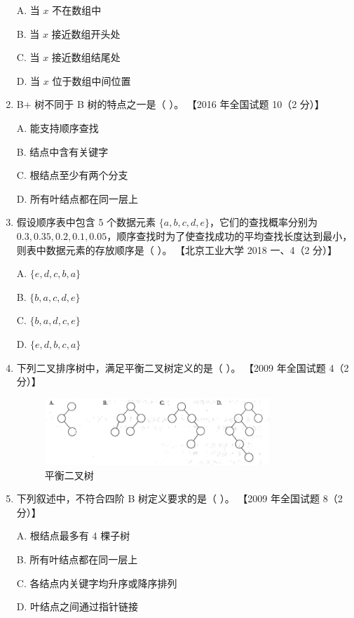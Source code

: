 \documentclass[lang=cn,newtx,10pt,scheme=chinese]{elegantbook}
\begin{document}
\begin{enumerate}
    A. 当 $x$ 不在数组中  

    B. 当 $x$ 接近数组开头处  

    C. 当 $x$ 接近数组结尾处 

    D. 当 $x$ 位于数组中间位置  

    \item B+ 树不同于 B 树的特点之一是（ ）。  
    【2016 年全国试题 10（2 分）】  

    A. 能支持顺序查找  

    B. 结点中含有关键字  

    C. 根结点至少有两个分支  

    D. 所有叶结点都在同一层上  


    \item 假设顺序表中包含 5 个数据元素 $\{a, b, c, d, e\}$，它们的查找概率分别为 $0.3, 0.35, 0.2, 0.1, 0.05$，顺序查找时为了使查找成功的平均查找长度达到最小，则表中数据元素的存放顺序是（ ）。  
    【北京工业大学 2018 一、4（2 分）】  

    A. $\{e, d, c, b, a\}$  

    B. $\{b, a, c, d, e\}$
     
    C. $\{b, a, d, c, e\}$  

    D. $\{e, d, b, c, a\}$  

    \item 下列二叉排序树中，满足平衡二叉树定义的是（ ）。  
    【2009 年全国试题 4（2 分）】  

    \begin{figure}[h!]
        \centering
        \includegraphics[width=0.8\textwidth]{./figure/exercisePicPDF/chapter9/9-11.pdf}
        \caption{平衡二叉树}
    \end{figure}

    \item 下列叙述中，不符合四阶 B 树定义要求的是（ ）。  
    【2009 年全国试题 8（2 分）】 

    A. 根结点最多有 4 棵子树  

    B. 所有叶结点都在同一层上  

    C. 各结点内关键字均升序或降序排列  

    D. 叶结点之间通过指针链接  


\end{enumerate}
\end{document}
